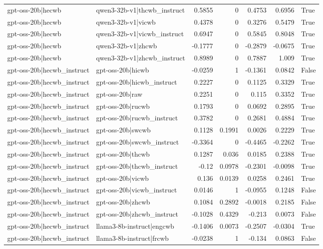 \begin{table}
\begin{tabular}{l l r r r r l}
gpt-oss-20b|hecwb & qwen3-32b-v1|thcwb_instruct & 0.5855 & 0 & 0.4753 & 0.6956 & True \\
gpt-oss-20b|hecwb & qwen3-32b-v1|vicwb & 0.4378 & 0 & 0.3276 & 0.5479 & True \\
gpt-oss-20b|hecwb & qwen3-32b-v1|vicwb_instruct & 0.6947 & 0 & 0.5845 & 0.8048 & True \\
gpt-oss-20b|hecwb & qwen3-32b-v1|zhcwb & -0.1777 & 0 & -0.2879 & -0.0675 & True \\
gpt-oss-20b|hecwb & qwen3-32b-v1|zhcwb_instruct & 0.8989 & 0 & 0.7887 & 1.009 & True \\
gpt-oss-20b|hecwb_instruct & gpt-oss-20b|hicwb & -0.0259 & 1 & -0.1361 & 0.0842 & False \\
gpt-oss-20b|hecwb_instruct & gpt-oss-20b|hicwb_instruct & 0.2227 & 0 & 0.1125 & 0.3329 & True \\
gpt-oss-20b|hecwb_instruct & gpt-oss-20b|raw & 0.2251 & 0 & 0.115 & 0.3352 & True \\
gpt-oss-20b|hecwb_instruct & gpt-oss-20b|rucwb & 0.1793 & 0 & 0.0692 & 0.2895 & True \\
gpt-oss-20b|hecwb_instruct & gpt-oss-20b|rucwb_instruct & 0.3782 & 0 & 0.2681 & 0.4884 & True \\
gpt-oss-20b|hecwb_instruct & gpt-oss-20b|swcwb & 0.1128 & 0.1991 & 0.0026 & 0.2229 & True \\
gpt-oss-20b|hecwb_instruct & gpt-oss-20b|swcwb_instruct & -0.3364 & 0 & -0.4465 & -0.2262 & True \\
gpt-oss-20b|hecwb_instruct & gpt-oss-20b|thcwb & 0.1287 & 0.036 & 0.0185 & 0.2388 & True \\
gpt-oss-20b|hecwb_instruct & gpt-oss-20b|thcwb_instruct & -0.12 & 0.0978 & -0.2301 & -0.0098 & True \\
gpt-oss-20b|hecwb_instruct & gpt-oss-20b|vicwb & 0.136 & 0.0139 & 0.0258 & 0.2461 & True \\
gpt-oss-20b|hecwb_instruct & gpt-oss-20b|vicwb_instruct & 0.0146 & 1 & -0.0955 & 0.1248 & False \\
gpt-oss-20b|hecwb_instruct & gpt-oss-20b|zhcwb & 0.1084 & 0.2892 & -0.0018 & 0.2185 & False \\
gpt-oss-20b|hecwb_instruct & gpt-oss-20b|zhcwb_instruct & -0.1028 & 0.4329 & -0.213 & 0.0073 & False \\
gpt-oss-20b|hecwb_instruct & llama3-8b-instruct|engcwb & -0.1406 & 0.0073 & -0.2507 & -0.0304 & True \\
gpt-oss-20b|hecwb_instruct & llama3-8b-instruct|frcwb & -0.0238 & 1 & -0.134 & 0.0863 & False \\

\end{tabular}
\end{table}
